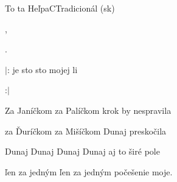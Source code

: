 \setcounter{page}{90}
\begin{song}{To ta Heľpa}{C}{Tradicionál (sk)}

\begin{SBVerse}

      ,

      .

$|$:  je sto  sto  mojej li

       :$|$

\end{SBVerse}

\begin{SBVerse}

Za Janíčkom za Palíčkom krok by nespravila

za Ďuríčkom za Mišíčkom Dunaj preskočila

Dunaj Dunaj Dunaj Dunaj aj to širé pole

ľen za jedným ľen za jedným počešenie moje.

\end{SBVerse}

\end{song}

\clearpage
